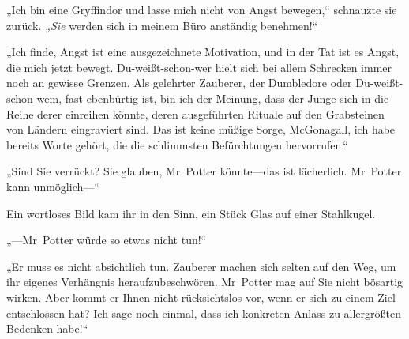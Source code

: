 „Ich bin eine Gryffindor und lasse mich nicht von Angst bewegen,“ schnauzte sie zurück. \emph{„Sie} werden sich in meinem Büro anständig benehmen!“

„Ich finde, Angst ist eine ausgezeichnete Motivation, und in der Tat ist es Angst, die mich jetzt bewegt. Du-weißt-schon-wer hielt sich bei allem Schrecken immer noch an gewisse Grenzen. Als gelehrter Zauberer, der Dumbledore oder Du-weißt-schon-wem, fast ebenbürtig ist, bin ich der Meinung, dass der Junge sich in die Reihe derer einreihen könnte, deren ausgeführten Rituale auf den Grabsteinen von Ländern eingraviert sind. Das ist keine müßige Sorge, McGonagall, ich habe bereits Worte gehört, die die schlimmsten Befürchtungen hervorrufen.“

„Sind Sie verrückt? Sie glauben, Mr~Potter könnte—das ist lächerlich. Mr~Potter kann unmöglich—“

Ein wortloses Bild kam ihr in den Sinn, ein Stück Glas auf einer Stahlkugel.

„—Mr~Potter würde so etwas nicht tun!“

„Er muss es nicht absichtlich tun. Zauberer machen sich selten auf den Weg, um ihr eigenes Verhängnis heraufzubeschwören. Mr~Potter mag auf Sie nicht bösartig wirken. Aber kommt er Ihnen nicht rücksichtslos vor, wenn er sich zu einem Ziel entschlossen hat? Ich sage noch einmal, dass ich konkreten Anlass zu allergrößten Bedenken habe!“

